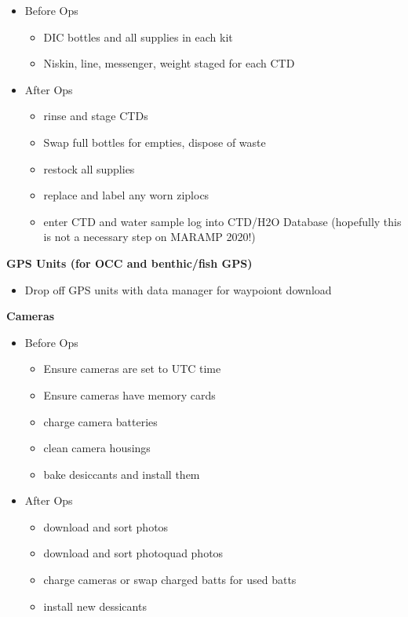 \documentclass[]{book}
\providecommand{\tightlist}{%
  \setlength{\itemsep}{0pt}\setlength{\parskip}{0pt}}
\begin{document}
\begin{itemize}
\tightlist
\item
  Before Ops

  \begin{itemize}
  \tightlist
  \item
    DIC bottles and all supplies in each kit
  \item
    Niskin, line, messenger, weight staged for each CTD
  \end{itemize}
\item
  After Ops

  \begin{itemize}
  \tightlist
  \item
    rinse and stage CTDs
  \item
    Swap full bottles for empties, dispose of waste
  \item
    restock all supplies
  \item
    replace and label any worn ziplocs
  \item
    enter CTD and water sample log into CTD/H2O Database (hopefully this is not a necessary step on MARAMP 2020!)
  \end{itemize}
\end{itemize}

\textbf{GPS Units (for OCC and benthic/fish GPS)}

\begin{itemize}
\tightlist
\item
  Drop off GPS units with data manager for waypoiont download
\end{itemize}

\textbf{Cameras}

\begin{itemize}
\tightlist
\item
  Before Ops

  \begin{itemize}
  \tightlist
  \item
    Ensure cameras are set to UTC time
  \item
    Ensure cameras have memory cards
  \item
    charge camera batteries
  \item
    clean camera housings
  \item
    bake desiccants and install them
  \end{itemize}
\item
  After Ops

  \begin{itemize}
  \tightlist
  \item
    download and sort photos
  \item
    download and sort photoquad photos
  \item
    charge cameras or swap charged batts for used batts
  \item
    install new dessicants
  \end{itemize}
\end{itemize}
\end{document}

